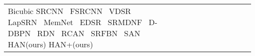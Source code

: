 \documentclass[runningheads]{llncs}
\begin{document}
\begin{table}[!ht]
\begin{tabular}{|p{7em}|p{2.5em}|p{2.5em}|p{3em}|p{2.5em}|p{3em}|p{2.5em}|p{3em}|p{2.5em}|p{3em}|p{2.5em}|p{3em}|}
		\hline
		\hline
		Bicubic \newline{}SRCNN~\cite{dong2014learning} \newline{} FSRCNN~\cite{dong2016accelerating} \newline{} VDSR~\cite{kim2016accurate} \newline{} LapSRN~\cite{lai2017deep} \newline{} MemNet~\cite{tai2017memnet} \newline{} EDSR~\cite{lim2017enhanced} \newline{} SRMDNF~\cite{zhang2018learning}  \newline{} D-DBPN~\cite{haris2018deep} \newline{} RDN~\cite{zhang2018residual} \newline{} RCAN~\cite{zhang2018image} \newline{} SRFBN~\cite{li2019feedback} \newline{} SAN~\cite{dai2019second} \newline{} HAN(ours) \newline{} HAN+(ours) &

\end{tabular}
\end{table}
\end{document}
